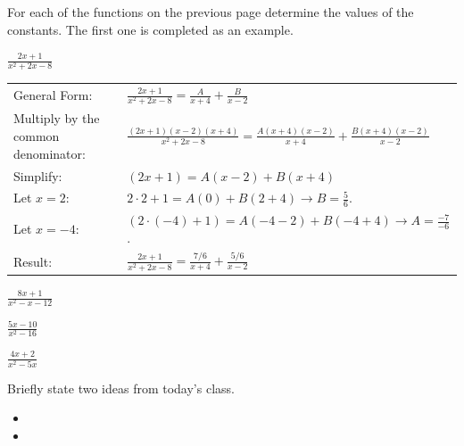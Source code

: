 \begin{problem}
  \item For each of the functions on the previous page determine the values of the constants.
    The first one is completed as an example.
    \begin{subproblem}
      \item $\frac{2x+1}{x^2+2x-8}$ \\
      \begin{tabular}{ll}
        General Form: & $\frac{2x+1}{x^2+2x-8}=\frac{A}{x+4} + \frac{B}{x-2}$ \\ [10pt]
        Multiply by the common denominator:  & $\frac{(2x+1)(x-2)(x+4)}{x^2+2x-8}=\frac{A(x+4)(x-2)}{x+4} + \frac{B(x+4)(x-2)}{x-2}$ \\ [10pt]
        Simplify: & $(2x+1)=A(x-2) + B(x+4)$ \\ [10pt]
        Let $x=2$: & $2\cdot 2 + 1 = A(0) + B(2+4) \rightarrow B=\frac{5}{6}$. \\ [10pt]
        Let $x=-4$: & $(2\cdot (-4) + 1) = A(-4-2) + B(-4+4) \rightarrow A=\frac{-7}{-6}$. \\ [10pt]
        Result: & $\frac{2x+1}{x^2+2x-8}=\frac{7/6}{x+4} + \frac{5/6}{x-2}$
      \end{tabular}
      \item $\frac{8x+1}{x^2-x-12}$ \\
        \vfill

        \clearpage
      \item $\frac{5x-10}{x^2-16}$ \\
        \vfill
      \item $\frac{4x+2}{x^2-5x}$ \\
        \vfill
    \end{subproblem}


\end{problem}

\postClass

\begin{problem}
\item Briefly state two ideas from today's class.
  \begin{itemize}
  \item
  \item
  \end{itemize}
\item
  \begin{subproblem}
    \item
  \end{subproblem}
\end{problem}


